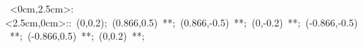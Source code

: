 \hbox{
\xy    <0cm,2.5cm>:<2.5cm,0cm>::
       (0,0.2); (0.866,0.5) **\dir{-}; (0.866,-0.5) **\dir{-};
	 (0,-0.2) **\dir{-}; (-0.866,-0.5) **\dir{-};
	 (-0.866,0.5) **\dir{-}; (0,0.2) **\dir{-};
\endxy}
